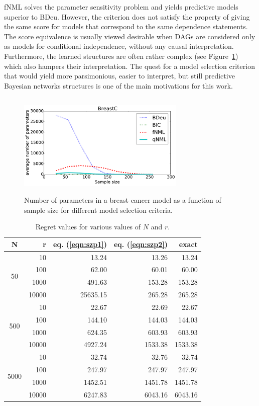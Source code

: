 fNML solves the parameter sensitivity problem and yields predictive
models superior to BDeu.  However, the criterion does not satisfy the
property of giving the same score for models that correspond to the
same dependence statements. The score equivalence is usually viewed desirable when DAGs are considered only as models for conditional independence, without any causal interpretation. Furthermore, the learned structures are
often rather complex (see Figure~\ref{fig:bcnpmean}) which also
hampers their interpretation. The quest for a model selection
criterion that would yield more parsimonious, easier to interpret, but
still predictive Bayesian networks structures is one of the main
motivations for this work.

\begin{figure}
\centering
\includegraphics[width=8cm,height=5cm]{qNML_images/breast_cancer_npmean.pdf}
\caption{Number of parameters in a breast cancer model as a function
  of sample size for different model selection criteria.}
\label{fig:bcnpmean}
\end{figure}



\begin{table}
\caption{Regret values for various values of $N$ and $r$.}
\label{tbl:regrets}
\begin{center}
\begin{tabular}{crrrr}
N & r & eq. (\ref{eqn:szp1}) & eq. (\ref{eqn:szp2}) & exact \\
\midrule
\multirow{4}{*}{50} & 10 & 13.24 & 13.26 & 13.24 \\
& 100 & 62.00 & 60.01 & 60.00 \\
& 1000 & 491.63 & 153.28 & 153.28 \\
& 10000 & 25635.15 & 265.28 & 265.28 \\
\midrule
\multirow{4}{*}{500} & 10 & 22.67 & 22.69 & 22.67 \\
& 100 & 144.10 & 144.03 & 144.03 \\
& 1000 & 624.35 & 603.93 & 603.93 \\
& 10000 & 4927.24 & 1533.38 & 1533.38 \\
\midrule
\multirow{4}{*}{5000} & 10 & 32.74 & 32.76 & 32.74 \\
& 100 & 247.97 & 247.97 & 247.97 \\
& 1000 & 1452.51 & 1451.78 & 1451.78 \\
& 10000 & 6247.83 & 6043.16 & 6043.16 \\
\bottomrule
\end{tabular}
\end{center}
\end{table}
